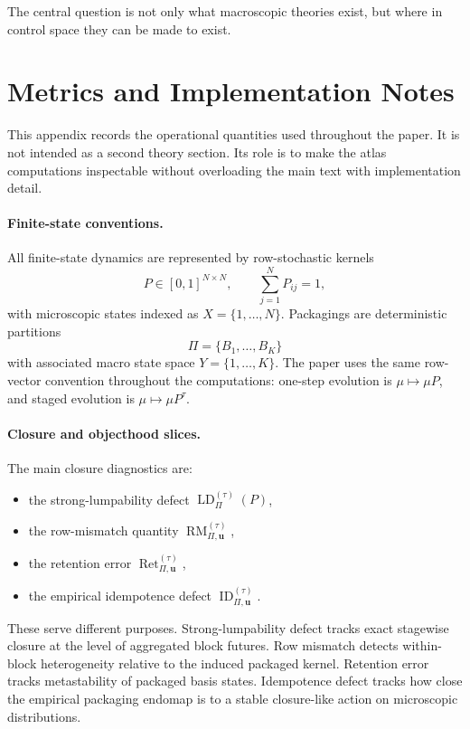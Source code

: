 \documentclass[11pt]{article}
\theoremstyle{definition}
\begin{document}
The central question is not only what macroscopic theories exist, but where in control space they can be made to exist.
 
\appendix
\section{Metrics and Implementation Notes}
\label{app:metrics}

This appendix records the operational quantities used throughout the paper. It is not intended as a second theory section. Its role is to make the atlas computations inspectable without overloading the main text with implementation detail.

\paragraph{Finite-state conventions.}
All finite-state dynamics are represented by row-stochastic kernels
\[
P\in[0,1]^{N\times N},
\qquad
\sum_{j=1}^{N}P_{ij}=1,
\]
with microscopic states indexed as $X=\{1,\dots,N\}$. Packagings are deterministic partitions
\[
\Pi=\{B_{1},\dots,B_{K}\}
\]
with associated macro state space $Y=\{1,\dots,K\}$. The paper uses the same row-vector convention throughout the computations: one-step evolution is $\mu \mapsto \mu P$, and staged evolution is $\mu \mapsto \mu P^{\tau}$.

\paragraph{Closure and objecthood slices.}
The main closure diagnostics are:
\begin{itemize}
    \item the strong-lumpability defect $\operatorname{LD}_{\Pi}^{(\tau)}(P)$,
    \item the row-mismatch quantity $\operatorname{RM}_{\Pi,\mathbf{u}}^{(\tau)}$,
    \item the retention error $\operatorname{Ret}_{\Pi,\mathbf{u}}^{(\tau)}$,
    \item the empirical idempotence defect $\operatorname{ID}_{\Pi,\mathbf{u}}^{(\tau)}$.
\end{itemize}
These serve different purposes. Strong-lumpability defect tracks exact stagewise closure at the level of aggregated block futures. Row mismatch detects within-block heterogeneity relative to the induced packaged kernel. Retention error tracks metastability of packaged basis states. Idempotence defect tracks how close the empirical packaging endomap is to a stable closure-like action on microscopic distributions.
\end{document}
